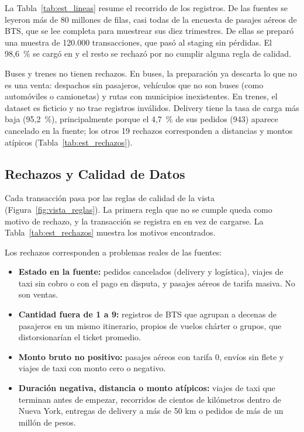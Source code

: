La Tabla~\ref{tab:est_lineas} resume el recorrido de los registros. De las
fuentes se leyeron más de 80 millones de filas, casi todas de la encuesta de
pasajes aéreos de BTS, que se lee completa para muestrear sus diez trimestres.
De ellas se preparó una muestra de 120.000 transacciones, que pasó al staging
sin pérdidas. El 98,6~\% se cargó en  y el resto se rechazó
por no cumplir alguna regla de calidad.



Buses y trenes no tienen rechazos. En buses, la preparación ya descarta lo que
no es una venta: despachos sin pasajeros, vehículos que no son buses (como
automóviles o camionetas) y rutas con municipios inexistentes. En trenes, el
dataset es ficticio y no trae registros inválidos. Delivery tiene la tasa de
carga más baja (95,2~\%), principalmente porque el 4,7~\% de sus pedidos
(943) aparece cancelado en la fuente; los otros 19 rechazos corresponden a
distancias y montos atípicos (Tabla~\ref{tab:est_rechazos}).

\subsection{Rechazos y Calidad de Datos}

Cada transacción pasa por las reglas de calidad de la vista
 (Figura~\ref{fig:vista_reglas}). La primera
regla que no se cumple queda como motivo de rechazo, y la transacción se
registra en  en vez de cargarse. La
Tabla~\ref{tab:est_rechazos} muestra los motivos encontrados.



Los rechazos corresponden a problemas reales de las fuentes:

\begin{itemize}[leftmargin=*]
  \item \textbf{Estado en la fuente:} pedidos cancelados (delivery y
        logística), viajes de taxi sin cobro o con el pago en disputa, y
        pasajes aéreos de tarifa masiva. No son ventas.
  \item \textbf{Cantidad fuera de 1 a 9:} registros de BTS que agrupan a
        decenas de pasajeros en un mismo itinerario, propios de vuelos chárter
        o grupos, que distorsionarían el ticket promedio.
  \item \textbf{Monto bruto no positivo:} pasajes aéreos con tarifa 0, envíos
        sin flete y viajes de taxi con monto cero o negativo.
  \item \textbf{Duración negativa, distancia o monto atípicos:} viajes de taxi
        que terminan antes de empezar, recorridos de cientos de kilómetros
        dentro de Nueva York, entregas de delivery a más de 50 km o pedidos de
        más de un millón de pesos.
\end{itemize}

